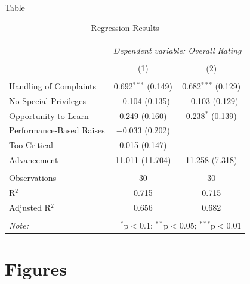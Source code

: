 \documentclass[aspectratio=43]{beamer}
\begin{document}
\begin{frame}{Table}
    
    {\fontsize{8}{10}\selectfont 
        
        \begin{table}[!htbp] \centering 
            \caption{Regression Results} 
            \label{}
            
            \begin{tabular}{@{\extracolsep{5pt}}lcc} 
            \hline 
            \hline \\[-1.8ex] 
            & \multicolumn{2}{c}{\textit{Dependent variable: Overall Rating}} \\ 
            \cline{2-3} 
            \\[-1.8ex] & (1) & (2)\\ 
            \hline \\[-1.8ex] 
            Handling of Complaints & 0.692$^{***}$ (0.149) & 0.682$^{***}$ (0.129) \\ 
            No Special Privileges & $-$0.104 (0.135) & $-$0.103 (0.129) \\ 
            Opportunity to Learn & 0.249 (0.160) & 0.238$^{*}$ (0.139) \\ 
            Performance-Based Raises & $-$0.033 (0.202) &  \\ 
            Too Critical & 0.015 (0.147) &  \\ 
            Advancement & 11.011 (11.704) & 11.258 (7.318) \\ 
            \hline \\[-1.8ex] 
            Observations & 30 & 30 \\ 
            R$^{2}$ & 0.715 & 0.715 \\ 
            Adjusted R$^{2}$ & 0.656 & 0.682 \\ 
            \hline 
            \hline \\[-1.8ex] 
            \textit{Note:}  & \multicolumn{2}{r}{$^{*}$p$<$0.1; $^{**}$p$<$0.05; $^{***}$p$<$0.01} \\ 
            \end{tabular} 
        \end{table}
    }
    
\end{frame}

\section{Figures}
\end{document}
